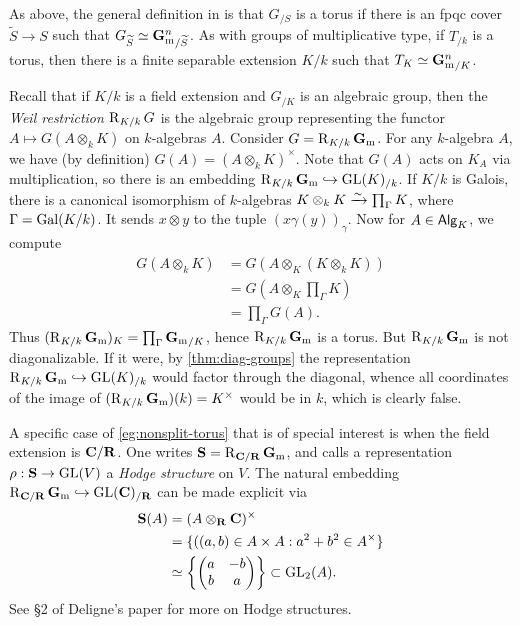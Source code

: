 \begin{hard}
As above, the general definition in \cite[IX 1.3]{sga3-ii} is that $G_{/S}$ is 
a torus if there is an fpqc cover $\widetilde S\to S$ such that 
$G_{\widetilde S}\simeq {\mathbf{G}_\mathrm{m}^n}_{/\widetilde S}$. As with groups of 
multiplicative type, if $T_{/k}$ is a torus, then there is a finite 
separable extension $K/k$ such that $T_K\simeq {\mathbf{G}_\mathrm{m}^n}_{/K}$. 
\end{hard}

\begin{example}\label{eg:nonsplit-torus}
Recall that if $K/k$ is a field extension and $G_{/K}$ is an algebraic group, 
then the \emph{Weil restriction} $\operatorname{R}_{K/k} G$ is the algebraic group 
representing the functor $A\mapsto G(A\otimes_k K)$ on $k$-algebras $A$. 
Consider $G=\operatorname{R}_{K/k}\mathbf{G}_\mathrm{m}$. For any $k$-algebra $A$, we have (by definition) 
$G(A)=(A\otimes_k K)^\times$. Note that $G(A)$ acts on $K_A$ via 
multiplication, so there is an embedding 
$\operatorname{R}_{K/k}\mathbf{G}_\mathrm{m} \hookrightarrow \operatorname{GL}(K)_{/k}$. If $K/k$ is Galois, there is a canonical 
isomorphism of $k$-algebras $K\otimes_k K\xrightarrow\sim \prod_\Gamma K$, where 
$\Gamma=\operatorname{Gal}(K/k)$. It sends $x\otimes y$ to the tuple 
$(x\gamma(y))_\gamma$. Now for $A\in \mathsf{Alg}_{K}$, we compute 
\begin{align*}
  G(A\otimes_k K) 
    &= G(A\otimes_K (K\otimes_k K)) \\
    &= G\left(A\otimes_K \prod_\Gamma K\right) \\
    &= \prod_\Gamma G(A) .
\end{align*}
Thus $(\operatorname{R}_{K/k} \mathbf{G}_\mathrm{m})_K = \prod_\Gamma{\mathbf{G}_\mathrm{m}}_{/K}$, hence $\operatorname{R}_{K/k}\mathbf{G}_\mathrm{m}$ 
is a torus. But $\operatorname{R}_{K/k}\mathbf{G}_\mathrm{m}$ is not diagonalizable. If it were,
by \autoref{thm:diag-groups} the 
representation $\operatorname{R}_{K/k}\mathbf{G}_\mathrm{m}\hookrightarrow \operatorname{GL}(K)_{/k}$ would factor through the 
diagonal, whence all coordinates of the image of $(\operatorname{R}_{K/k}\mathbf{G}_\mathrm{m})(k)=K^\times$ 
would be in $k$, which is clearly false. 
\end{example}

\begin{example}\label{eg:hodge-structure}
A specific case of \autoref{eg:nonsplit-torus} that is of special interest 
is when the field extension is $\mathbf{C}/\mathbf{R}$. One writes $\mathbf{S}=\operatorname{R}_{\mathbf{C}/\mathbf{R}}\mathbf{G}_\mathrm{m}$, 
and calls a representation $\rho:\mathbf{S}\to \operatorname{GL}(V)$ a \emph{Hodge structure} on 
$V$. The natural embedding $\operatorname{R}_{\mathbf{C}/\mathbf{R}}\mathbf{G}_\mathrm{m}\hookrightarrow\operatorname{GL}(\mathbf{C})_{/\mathbf{R}}$ can be 
made explicit via
\begin{align*}
  \mathbf{S}(A) 
    &= (A\otimes_{\mathbf{R}}\mathbf{C})^\times \\
    &= \{((a,b)\in A\times A:a^2+b^2\in A^\times\} \\
    &\simeq \left\{\begin{pmatrix} a & -b \\ b & a \end{pmatrix}\right\}\subset \operatorname{GL}_2(A) .
\end{align*}
See \S 2 of Deligne's paper \cite{deligne-1971} for more on Hodge structures. 
\end{example}

